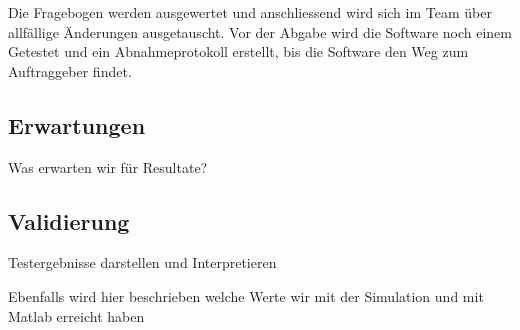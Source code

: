 Die Fragebogen werden ausgewertet und anschliessend wird sich im Team über allfällige Änderungen ausgetauscht. 
Vor der Abgabe wird die Software noch einem Getestet und ein Abnahmeprotokoll erstellt, bis die Software den Weg zum Auftraggeber findet.
   
\subsection{Erwartungen} \label{subsec:erwartungen}
Was erwarten wir für Resultate?

\subsection{Validierung} \label{subsec:validierung}
Testergebnisse darstellen und Interpretieren

Ebenfalls wird hier beschrieben welche Werte wir mit der Simulation und mit Matlab erreicht haben
